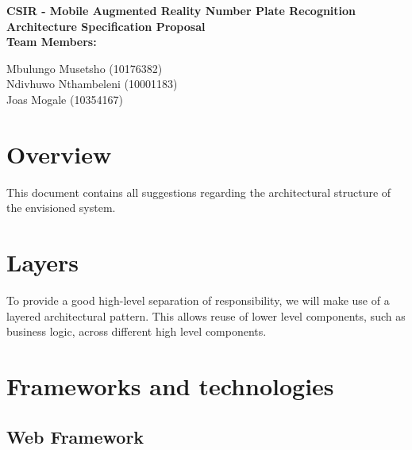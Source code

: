 \documentclass[12pt]{article}
\newcommand{\Title}{CSIR - Mobile Augmented Reality Number Plate Recognition} %
\begin{document}
        \vspace{4em}
        
        \begin{center}%
        
          \LARGE \bf \Title \\[4em]
          \LARGE {\bf Architecture Specification Proposal}\\[1em]
          \LARGE {\bf Team Members:}\\[2em]
          \large
          
             Mbulungo Musetsho                          (10176382) \\[1em]
             Ndivhuwo Nthambeleni (10001183)	\\[1em]
             Joas Mogale (10354167)		\\[1em]
            
        \end{center}%
        

        \newpage
        \tableofcontents    
                \newpage
                \section{Overview}
               	\vspace{0.1in}
               	This document contains all suggestions regarding the architectural structure of the envisioned system.
                \section{Layers}
                To provide a good high-level separation of responsibility, we will make use of a layered architectural pattern. This allows reuse of lower level components, such as business logic, across different high level components.
                \section{Frameworks and technologies}
                
                	\subsection{Web Framework}
                	
\end{document}
